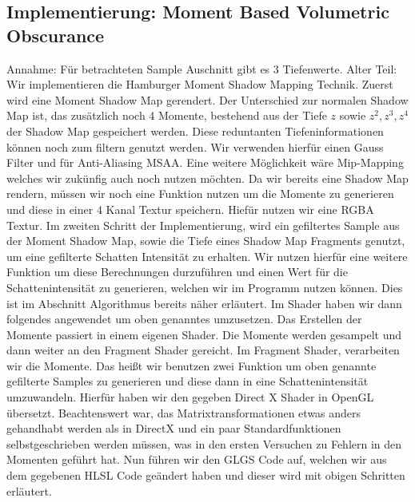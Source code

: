 \documentclass[runningheaders,a4paper]{llncs}
\begin{document}
\subsection{Implementierung: Moment Based Volumetric Obscurance}
Annahme: Für betrachteten Sample Auschnitt gibt es 3 Tiefenwerte.
Alter Teil:\\
Wir implementieren die Hamburger Moment Shadow Mapping Technik. 
Zuerst wird eine Moment Shadow Map gerendert. Der Unterschied zur normalen Shadow Map ist, das zusätzlich noch 4 Momente, bestehend aus der Tiefe $z$ sowie $z^2,z^3,z^4$ der Shadow Map gespeichert werden. Diese reduntanten Tiefeninformationen können noch zum filtern genutzt werden. Wir verwenden hierfür einen Gauss Filter und für Anti-Aliasing MSAA. Eine weitere Möglichkeit wäre Mip-Mapping welches wir zukünfig auch noch nutzen möchten. Da wir bereits eine Shadow Map rendern, müssen wir  noch eine Funktion nutzen um die Momente zu generieren und diese in einer 4 Kanal Textur speichern. Hiefür nutzen wir eine RGBA Textur.
Im zweiten Schritt der Implementierung, wird ein gefiltertes Sample aus der Moment Shadow Map, sowie die Tiefe eines Shadow Map Fragments genutzt, um eine gefilterte Schatten Intensität zu erhalten.
Wir nutzen hierfür eine weitere Funktion um diese Berechnungen durzuführen und einen Wert für die Schattenintensität zu generieren, welchen wir im Programm nutzen können. Dies ist im Abschnitt Algorithmus bereits näher erläutert.
Im Shader haben wir dann folgendes angewendet um oben genanntes umzusetzen.
Das Erstellen der Momente passiert in einem eigenen Shader. Die Momente werden gesampelt und dann weiter an den Fragment Shader gereicht.
Im Fragment Shader, verarbeiten wir die Momente. Das heißt wir benutzen zwei Funktion um oben genannte gefilterte Samples zu generieren und diese dann in eine Schattenintensität umzuwandeln. Hierfür haben wir den gegeben Direct X Shader in OpenGL übersetzt. Beachtenswert war, das Matrixtransformationen etwas anders gehandhabt werden als in DirectX und ein paar Standardfunktionen selbstgeschrieben werden müssen, was in den ersten Versuchen zu Fehlern in den Momenten geführt hat. Nun führen wir den GLGS Code auf, welchen wir aus dem gegebenen HLSL Code geändert haben und dieser wird mit obigen Schritten erläutert.
\end{document}
